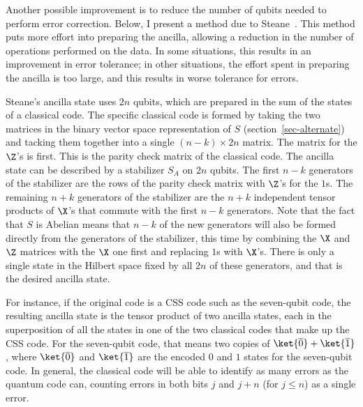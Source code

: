 Another possible improvement is to reduce the number of qubits needed
to perform error correction.  Below, I present a method due to
Steane~\cite{steane-correction}.  This method puts more effort into
preparing the ancilla, allowing a reduction in the number of operations
performed on the data.  In some situations, this results in an improvement
in error tolerance; in other situations, the effort spent in preparing the
ancilla is too large, and this results in worse tolerance for errors.

Steane's ancilla state uses $2n$ qubits, which are prepared in the sum of
the states of a classical code.  The specific classical code is formed by
taking the two matrices in the binary vector space representation of $S$
(section~\ref{sec-alternate}) and tacking them together into a single $(n-k)
\times 2n$ matrix.  The matrix for the $\Z$'s is first.  This is the parity
check matrix of the classical code.  The ancilla state can be described by a
stabilizer $S_A$ on $2n$ qubits.  The first $n-k$ generators of the stabilizer
are the rows of the parity check matrix with $\Z$'s for the $1$s.  The remaining
$n+k$ generators of the stabilizer are the $n+k$ independent tensor
products of $\X$'s that commute with the first $n-k$ generators.  Note that
the fact that $S$ is Abelian means that $n-k$ of the new generators will
also be formed directly from the generators of the stabilizer, this time by
combining the $\X$ and $\Z$ matrices with the $\X$ one first and
replacing $1$s with $\X$'s.  There is only a single state in the Hilbert space
fixed by all $2n$ of these generators, and that is the desired ancilla
state.

For instance, if the original code is a CSS code such as the seven-qubit code,
the resulting ancilla state is the tensor product of two ancilla states, each
in the superposition of all the states in one of the two classical codes that
make up the CSS code.  For the seven-qubit code, that means two copies of
$\ket{\overline{0}} + \ket{\overline{1}}$, where $\ket{\overline{0}}$ and
$\ket{\overline{1}}$ are the encoded $0$ and $1$ states for the seven-qubit
code.  In general, the classical code will be able to identify as many errors
as the quantum code can, counting errors in both bits $j$ and $j+n$ (for $j
\leq n$) as a single error.

